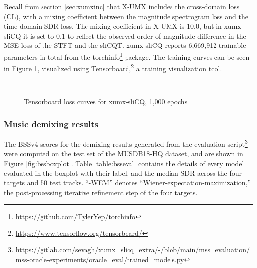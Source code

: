 \documentclass[report.tex]{subfiles}
\begin{document}
Recall from section \ref{sec:xumxinc} that X-UMX includes the cross-domain loss (CL), with a mixing coefficient between the magnitude spectrogram loss and the time-domain SDR loss. The mixing coefficient in X-UMX is 10.0, but in xumx-sliCQ it is set to 0.1 to reflect the observed order of magnitude difference in the MSE loss of the STFT and the sliCQT. xumx-sliCQ reports 6,669,912 trainable parameters in total from the torchinfo\footnote{\url{https://github.com/TylerYep/torchinfo}} package. The training curves can be seen in Figure \ref{fig:networkloss}, visualized using Tensorboard,\footnote{\url{https://www.tensorflow.org/tensorboard/}} a training visualization tool.

\begin{figure}[ht]
	\centering
	\\
	\caption{Tensorboard loss curves for xumx-sliCQ, 1,000 epochs}
	\label{fig:networkloss}
\end{figure}

\newpagefill

\subsubsection{Music demixing results}
\label{sec:demixresults}

The BSSv4 scores for the demixing results generated from the evaluation script\footnote{\url{https://gitlab.com/sevagh/xumx_slicq_extra/-/blob/main/mss_evaluation/mss-oracle-experiments/oracle_eval/trained_models.py}} were computed on the test set of the MUSDB18-HQ dataset, and are shown in Figure \ref{fig:bssboxplot}. Table \ref{table:bsseval} contains the details of every model evaluated in the boxplot with their label, and the median SDR across the four targets and 50 test tracks. ``-WEM'' denotes ``Wiener-expectation-maximization,'' the post-processing iterative refinement step of the four targets.
\end{document}
